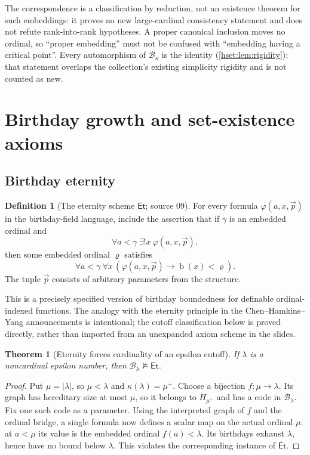 \documentclass[11pt,letterpaper]{article}
\newtheorem{theorem}{Theorem}[section]
\theoremstyle{definition}
\newtheorem{definition}[definition]{Definition}\aliascntresetthe{definition}
\theoremstyle{remark}
\newcommand{\bd}{\operatorname{b}}
\newcommand{\B}{\mathcal B}
\newcommand{\Et}{\mathsf{Et}}
\newcommand{\card}[1]{\lvert#1\rvert}
\begin{document}
The correspondence is a classification by reduction, not an existence theorem
for such embeddings: it proves no new large-cardinal consistency statement and
does not refute rank-into-rank hypotheses. A proper canonical inclusion moves
no ordinal, so ``proper embedding'' must not be confused with ``embedding
having a critical point''. Every automorphism of $\B_\kappa$ is the identity
(\cref{hset:lem:rigidity}); that statement overlaps the collection's existing
simplicity rigidity and is not counted as new.

\section{Birthday growth and set-existence axioms}
\label{hset:sec:growth}

\subsection{Birthday eternity}

\begin{definition}[The eternity scheme $\Et$; source 09]
For every formula $\varphi(a,x,\vec p)$ in the birthday-field language,
include the assertion that if $\gamma$ is an embedded ordinal and
\[
 \forall a<\gamma\ \exists!x\ \varphi(a,x,\vec p),
\]
then some embedded ordinal $\varrho$ satisfies
\[
 \forall a<\gamma\ \forall x\,
       (\varphi(a,x,\vec p)\longrightarrow\bd(x)<\varrho).
\]
The tuple $\vec p$ consists of arbitrary parameters from the structure.
\end{definition}

This is a precisely specified version of birthday boundedness for definable
ordinal-indexed functions. The analogy with the eternity principle in the
Chen--Hamkins--Yang announcements is intentional; the cutoff classification
below is proved directly, rather than imported from an unexpanded axiom
scheme in the slides.

\begin{theorem}[Eternity forces cardinality of an epsilon cutoff]
\label{hset:thm:eternity-noncardinal}
If $\lambda$ is a noncardinal epsilon number, then
$\B_\lambda\not\models\Et$.
\end{theorem}
\begin{proof}
Put $\mu=\card\lambda$, so $\mu<\lambda$ and
$\kappa(\lambda)=\mu^+$. Choose a bijection $f:\mu\to\lambda$.
Its graph has hereditary size at most $\mu$, so it belongs to
$H_{\mu^+}$ and has a code in $\B_\lambda$. Fix one such code as a
parameter. Using the interpreted graph of $f$ and the ordinal bridge, a
single formula now defines a scalar map on the actual ordinal $\mu$:
at $a<\mu$ its value is the embedded ordinal $f(a)<\lambda$.
Its birthdays exhaust $\lambda$, hence have no bound below $\lambda$.
This violates the corresponding instance of $\Et$.
\end{proof}
\end{document}
